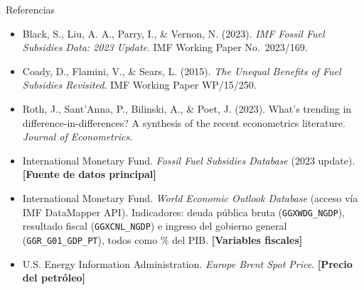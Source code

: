 \documentclass[aspectratio=169,10pt]{beamer}
\begin{document}
\begin{frame}{Referencias}
  \footnotesize
  \begin{itemize}
    \item Black, S., Liu, A. A., Parry, I., \& Vernon, N. (2023). \emph{IMF Fossil Fuel Subsidies
          Data: 2023 Update}. IMF Working Paper No.\ 2023/169.
    \item Coady, D., Flamini, V., \& Sears, L. (2015). \emph{The Unequal Benefits of Fuel Subsidies
          Revisited}. IMF Working Paper WP/15/250.
    \item Roth, J., Sant'Anna, P., Bilinski, A., \& Poet, J. (2023). What's trending in
          difference-in-differences? A synthesis of the recent econometrics literature.
          \emph{Journal of Econometrics}.
    \item International Monetary Fund. \emph{Fossil Fuel Subsidies Database} (2023 update).
          \textbf{[Fuente de datos principal]}
    \item International Monetary Fund. \emph{World Economic Outlook Database} (acceso vía IMF
          DataMapper API). Indicadores: deuda pública bruta (\texttt{GGXWDG\_NGDP}), resultado
          fiscal (\texttt{GGXCNL\_NGDP}) e ingreso del gobierno general (\texttt{GGR\_G01\_GDP\_PT}),
          todos como \% del PIB. \textbf{[Variables fiscales]}
    \item U.S. Energy Information Administration. \emph{Europe Brent Spot Price}.
          \textbf{[Precio del petróleo]}
  \end{itemize}

\end{frame}

\end{document}
